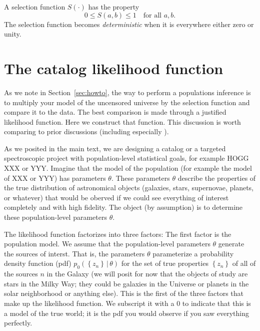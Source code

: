 \documentclass[modern]{aastex62}
\newcommand{\given}{\,|\,}
\newcommand{\set}[1]{\left\{{#1}\right\}}
\newcommand{\sectionname}{Section}
\begin{document}
A selection function $S(\cdot)$ has the property
\begin{equation}
0\leq S(a, b)\leq 1 \quad \mbox{for all $a, b$.}
\end{equation}
The selection function becomes \emph{deterministic} when it is
everywhere either zero or unity.

\section{The catalog likelihood function}\label{app:lf}

As we note in \sectionname~\ref{sec:howto}, the way to perform a populations
inference is to multiply your model of the uncensored universe by the
selection function and compare it to the data.
The best comparison is made through a justified likelihood function.
Here we construct that function.
This discussion is worth comparing to prior discussions (including
especially \citealt{loredo, bovy, exopop, mfg}).

As we posited in the main text, we are designing a catalog or a targeted
spectroscopic project
with population-level statistical goals, for example HOGG XXX or YYY.
Imagine that the model of the population (for example the model
of XXX or YYY) has parameters $\theta$.
These parameters $\theta$ describe the properties of the true distribution
of astronomical objects (galaxies, stars, supernovae, planets, or whatever)
that would be oberved if we could see everything of interest completely and
with high fidelity.
The object (by assumption) is to determine these population-level parameters
$\theta$.

The likelihood function factorizes into three factors:
The first factor is the population model.
We assume that the population-level parameters $\theta$ generate the
sources of interst.
That is, the parameters $\theta$ parameterize a probability density
function (pdf) $p_0(\set{z_n}\given\theta)$
for the set of true properties $\set{z_n}$ of all of the sources $n$
in the Galaxy (we will posit for now that the objects of study are
stars in the Milky Way; they could be galaxies in the Universe or
planets in the solar neighborhood or anything else).
This is the first of the three factors that make up the likelihood
function.
We subscript it with a $0$ to indicate that
this is a model of the true world;
it is the pdf you would observe if you saw everything perfectly.
\end{document}
